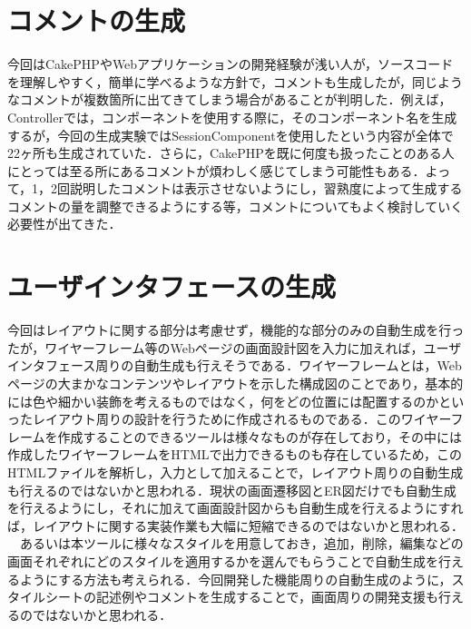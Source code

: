 \documentclass{funthesis}
\begin{document}
\section{コメントの生成}
今回はCakePHPやWebアプリケーションの開発経験が浅い人が，ソースコードを理解しやすく，簡単に学べるような方針で，コメントも生成したが，同じようなコメントが複数箇所に出てきてしまう場合があることが判明した．例えば，Controllerでは，コンポーネントを使用する際に，そのコンポーネント名を生成するが，今回の生成実験ではSessionComponentを使用したという内容が全体で22ヶ所も生成されていた．さらに，CakePHPを既に何度も扱ったことのある人にとっては至る所にあるコメントが煩わしく感じてしまう可能性もある．よって，1，2回説明したコメントは表示させないようにし，習熟度によって生成するコメントの量を調整できるようにする等，コメントについてもよく検討していく必要性が出てきた．

\section{ユーザインタフェースの生成}
今回はレイアウトに関する部分は考慮せず，機能的な部分のみの自動生成を行ったが，ワイヤーフレーム等のWebページの画面設計図を入力に加えれば，ユーザインタフェース周りの自動生成も行えそうである．ワイヤーフレームとは，Webページの大まかなコンテンツやレイアウトを示した構成図のことであり，基本的には色や細かい装飾を考えるものではなく，何をどの位置には配置するのかといったレイアウト周りの設計を行うために作成されるものである．このワイヤーフレームを作成することのできるツールは様々なものが存在しており，その中には作成したワイヤーフレームをHTMLで出力できるものも存在しているため，このHTMLファイルを解析し，入力として加えることで，レイアウト周りの自動生成も行えるのではないかと思われる．現状の画面遷移図とER図だけでも自動生成を行えるようにし，それに加えて画面設計図からも自動生成を行えるようにすれば，レイアウトに関する実装作業も大幅に短縮できるのではないかと思われる．\\
　あるいは本ツールに様々なスタイルを用意しておき，追加，削除，編集などの画面それぞれにどのスタイルを適用するかを選んでもらうことで自動生成を行えるようにする方法も考えられる．今回開発した機能周りの自動生成のように，スタイルシートの記述例やコメントを生成することで，画面周りの開発支援も行えるのではないかと思われる．
\end{document}
